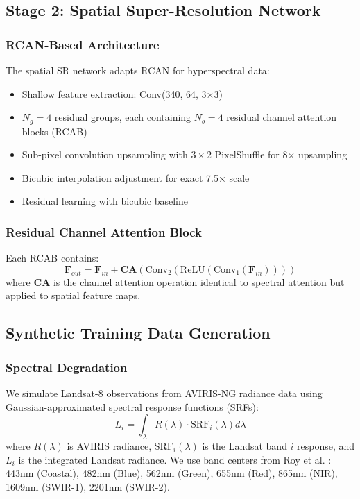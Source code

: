\documentclass[]{spieman}
\begin{document}
\subsection{Stage 2: Spatial Super-Resolution Network}

\subsubsection{RCAN-Based Architecture}

The spatial SR network adapts RCAN \cite{zhang2018rcan} for hyperspectral data:
\begin{itemize}
\item Shallow feature extraction: Conv(340, 64, 3×3)
\item $N_g=4$ residual groups, each containing $N_b=4$ residual channel attention blocks (RCAB)
\item Sub-pixel convolution upsampling \cite{shi2016subpixel} with $3 \times 2$ PixelShuffle for 8× upsampling
\item Bicubic interpolation adjustment for exact 7.5× scale
\item Residual learning with bicubic baseline
\end{itemize}

\subsubsection{Residual Channel Attention Block}

Each RCAB contains:
\begin{equation}
\mathbf{F}_{out} = \mathbf{F}_{in} + \mathbf{CA}(\text{Conv}_2(\text{ReLU}(\text{Conv}_1(\mathbf{F}_{in}))))
\end{equation}
where $\mathbf{CA}$ is the channel attention operation identical to spectral attention but applied to spatial feature maps.

\subsection{Synthetic Training Data Generation}

\subsubsection{Spectral Degradation}

We simulate Landsat-8 observations from AVIRIS-NG radiance data using Gaussian-approximated spectral response functions (SRFs):
\begin{equation}
L_i = \int_{\lambda} R(\lambda) \cdot \text{SRF}_i(\lambda) d\lambda
\end{equation}
where $R(\lambda)$ is AVIRIS radiance, $\text{SRF}_i(\lambda)$ is the Landsat band $i$ response, and $L_i$ is the integrated Landsat radiance. We use band centers from Roy et al. \cite{roy2014landsat}: 443nm (Coastal), 482nm (Blue), 562nm (Green), 655nm (Red), 865nm (NIR), 1609nm (SWIR-1), 2201nm (SWIR-2).
\end{document}
